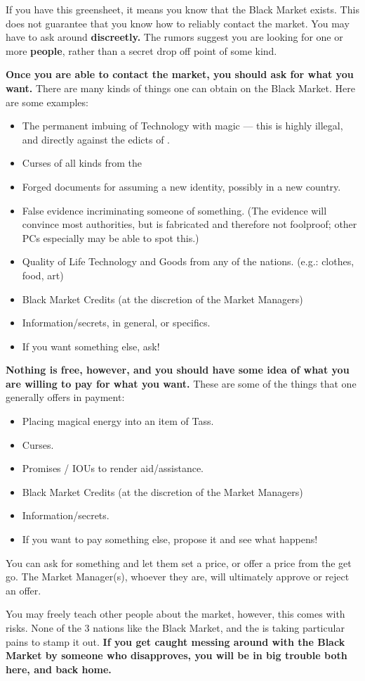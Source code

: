 \documentclass[green]{GL2020}
\begin{document}
\name{\gBMUse{}}

If you have this greensheet, it means you know that the Black Market exists. This does not guarantee that you know how to reliably contact the market. You may have to ask around \textbf{discreetly.} The rumors suggest you are looking for one or more \textbf{people}, rather than a secret drop off point of some kind.

\textbf{Once you are able to contact the market, you should ask for what you want.} There are many kinds of things one can obtain on the Black Market. Here are some examples:
\begin{itemize}
  \item The permanent imbuing of Technology with magic — this is highly illegal, and directly against the edicts of \cTechGod{}.
  \item Curses of all kinds from the \pFarm{}
  \item Forged documents for assuming a new identity, possibly in a new country.
  \item False evidence incriminating someone of something. (The evidence will convince most authorities, but is fabricated and therefore not foolproof; other PCs especially may be able to spot this.)
  \item Quality of Life Technology and Goods from any of the nations. (e.g.: clothes, food, art)
  \item Black Market Credits (at the discretion of the Market Managers)
  \item Information/secrets, in general, or specifics.
  \item If you want something else, ask!
\end{itemize}

\textbf{Nothing is free, however, and you should have some idea of what you are willing to pay for what you want.} These are some of the things that one generally offers in payment:
\begin{itemize}
  \item Placing magical energy into an item of Tass.
  \item Curses.
  \item Promises / IOUs to render aid/assistance.
  \item Black Market Credits (at the discretion of the Market Managers)
  \item Information/secrets.
  \item If you want to pay something else, propose it and see what happens!
\end{itemize}

You can ask for something and let them set a price, or offer a price from the get go. The Market Manager(s), whoever they are, will ultimately approve or reject an offer.

You may freely teach other people about the market, however, this comes with risks. None of the 3 nations like the Black Market, and the \pTech{} is taking particular pains to stamp it out. \textbf{If you get caught messing around with the Black Market by someone who disapproves, you will be in big trouble both here, and back home.}
\end{document}
